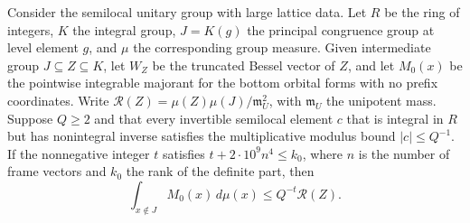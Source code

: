 \begin{lemma}
\label{lem:b-local-shell}
\emitthmsource
Consider the semilocal unitary group with large lattice data. Let $R$ be the ring of integers, $K$ the integral group,
$J=K(g)$ the principal congruence group at level element $g$, and $\mu$ the corresponding group measure.
Given intermediate group $J\subseteq Z\subseteq K$, let $W_Z$ be the truncated Bessel vector of $Z$,
and let $M_0(x)$ be the pointwise integrable majorant for the bottom orbital forms with no prefix coordinates.
Write $\mathcal R(Z)=\mu(Z)\mu(J)/\mathfrak m_U^2$, with $\mathfrak m_U$ the unipotent mass.
Suppose $Q\ge2$ and that every invertible semilocal element $c$ that is integral in $R$ but has nonintegral inverse
satisfies the multiplicative modulus bound $|c|\le Q^{-1}$.
If the nonnegative integer $t$ satisfies $t+2\cdot10^9 n^4\le k_0$,
where $n$ is the number of frame vectors and $k_0$ the rank of the definite part, then
\[
 \int_{x\notin J} M_0(x)\,d\mu(x)\le Q^{-t}\mathcal R(Z).
\]
\end{lemma}
